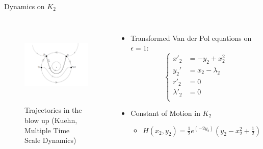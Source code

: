 \documentclass[11pt]{beamer}
\begin{document}
\begin{frame}{Dynamics on $K_2$}
\begin{columns}
\begin{figure}
    \centering
	\includegraphics[height=4cm,width=5cm]{Images/pres-cancard}
	\caption{Trajectories in the blow up (Kuehn, Multiple Time Scale Dynamics)}
\end{figure}
\begin{itemize}
\item Transformed Van der Pol equations on $ \epsilon=1$:
\begin{equation*}
    \begin{cases}
        x'_2&=-y_2+x_2^2\\
         y_2'&=x_2-\lambda_2\\
        r'_2&=0\\
        \lambda'_2&=0\\
    \end{cases}
\end{equation*}
\item Constant of Motion in $ K_2 $
\begin{itemize}
	\item $H(x_2,y_2)=\frac{1}{2}e^{(-2y_2)}\left(y_2-x^2_2+\frac{1}{2}\right)$
\end{itemize}

\end{itemize}
\end{columns}
\end{frame}
\end{document}
